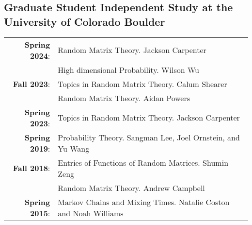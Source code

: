 \documentclass[letterpaper]{article}
\renewenvironment{itemize}{
  \begin{list}{}{
    \setlength{\leftmargin}{1em}
  }
}{
  \end{list}
}
\begin{document}
   \subsection*{Graduate Student Independent Study at the University of Colorado Boulder}
   \begin{tabular}{r l}
   	{\bf Spring 2024}: & Random Matrix Theory. Jackson Carpenter  \\
			&High dimensional Probability. Wilson Wu \\
   	{\bf Fall 2023}: & Topics in Random Matrix Theory. Calum Shearer  \\
			& Random Matrix Theory. Aidan Powers \\
	{\bf Spring 2023}: & Topics in Random Matrix Theory. Jackson Carpenter  \\
   	{\bf Spring 2019}: & Probability Theory.  Sangman Lee, Joel Ornstein, and Yu Wang \\
   	{\bf Fall 2018}: & Entries of Functions of Random Matrices.  Shumin Zeng \\
   			& Random Matrix Theory.  Andrew Campbell \\
   	{\bf Spring 2015}: & Markov Chains and Mixing Times.  Natalie Coston and Noah Williams 
   \end{tabular} 
   
   
   
\end{document}
